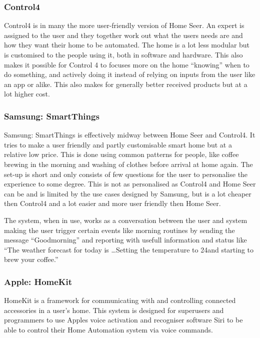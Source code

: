\subsubsection{Control4}
Control4 is in many the more user-friendly version of Home Seer. An expert is assigned to the user and they together work out what the users needs are and how they want their home to be automated. The home is a lot less modular but is customised to the people using it, both in software and hardware. This also makes it possible for Control 4 to focuses more on the home \enquote{knowing} when to do something, and actively doing it instead of relying on inputs from the user like an app or alike. This also makes for generally better received products but at a lot higher cost.%

\subsubsection{Samsung: SmartThings}
Samsung: SmartThings is effectively midway between Home Seer and Control4. It tries to make a user friendly and partly customisable smart home but at a relative low price. This is done using common patterns for people, like coffee brewing in the morning and washing of clothes before arrival at home again. The set-up is short and only consists of few questions for the user to personalise the experience to some degree. This is not as personalised as Control4 and Home Seer can be and is limited by the use cases designed by Samsung, but is a lot cheaper then Control4 and a lot easier and more user friendly then Home Seer.

The system, when in use, works as a conversation between the user and system making the user trigger certain events like morning routines by sending the message \enquote{Goodmorning} and reporting with usefull information and status like \enquote{The weather forecast for today is \dots Setting the temperature to 24\degree  and starting to brew your coffee.}

\subsubsection{Apple: HomeKit}
HomeKit is a framework for communicating with and controlling connected accessories in a user's home. %
This system is designed for superusers and programmers to use Apples voice activation and recogniser software Siri to be able to control their Home Automation system via voice commands.

